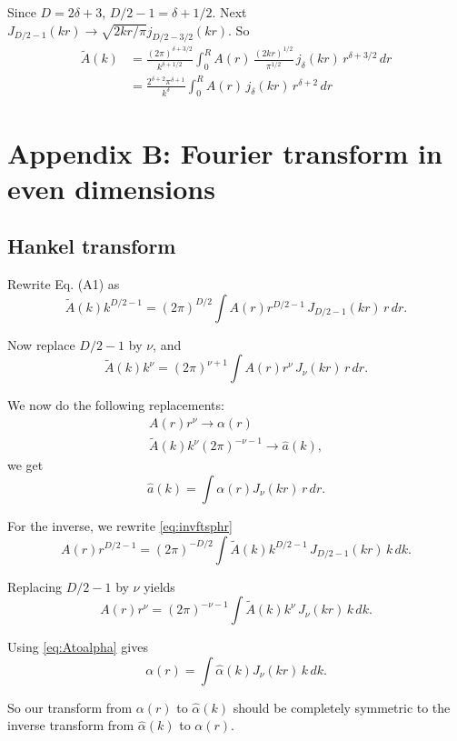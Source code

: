 \documentclass[aip,jcp,reprint,superscriptaddress]{revtex4-1}
\numberwithin{equation}{subsection}
\begin{document}
Since $D = 2\delta + 3$, $D/2 - 1 = \delta + 1/2$.
%
Next $J_{D/2-1}(kr) \rightarrow \sqrt{2 k r/\pi} j_{D/2-3/2} (kr)$.
%
So
\begin{align*}
\tilde A(k)
&=
\frac{ (2 \pi)^{\delta + 3/2} } { k^{\delta + 1/2} }
\int_0^R
  A(r) \, \frac{ (2kr)^{1/2} } { \pi^{1/2} } \,
  j_\delta(k r) \, r^{\delta + 3/2}\, dr \\
&=
  \frac{ 2^{\delta + 2} \pi^{\delta + 1} } { k^\delta }
\int_0^R
  A(r) \, j_\delta(k r) \, r^{\delta + 2} \, dr
\end{align*}



\section{Appendix B: Fourier transform in even dimensions}

\subsection{Hankel transform}

Rewrite Eq. (A1) as
\[
\tilde{A}(k) k^{D/2-1}
= (2 \pi)^{D/2}
\int A(r) r^{D/2-1} \, J_{D/2-1}(kr) \, r \, dr.
\]

Now replace $D/2 - 1$ by $\nu$, and
\[
\tilde{A}(k) k^\nu
= (2 \pi)^{\nu+1}
\int A(r) r^\nu \, J_{\nu}(kr) \, r \, dr.
\]

We now do the following replacements:
\begin{equation}
\begin{split}
  A(r) r^\nu \rightarrow \alpha(r) \\
  \tilde{A}(k) k^\nu (2\pi)^{-\nu-1}
  \rightarrow
  \hat a(k),
\end{split}
\label{eq:Atoalpha}
\end{equation}
we get
\[
\hat a(k)
=
\int \alpha(r) J_\nu(kr) \, r \, dr.
\]

For the inverse, we rewrite \eqref{eq:invftsphr}
\[
A(r) r^{D/2-1}
=
(2\pi)^{-D/2}
\int \tilde{A}(k) k^{D/2-1} \, J_{D/2-1}(kr) \, k \, dk.
\]

Replacing $D/2 - 1$ by $\nu$ yields
\[
A(r) r^\nu
=
(2\pi)^{-\nu-1}
\int \tilde{A}(k) k^\nu \, J_\nu(kr) \, k \, dk.
\]

Using \eqref{eq:Atoalpha} gives
\[
\alpha(r)
=
\int \hat \alpha(k) J_\nu(kr) \, k \, dk.
\]

So our transform from $\alpha(r)$ to $\hat\alpha(k)$
should be completely symmetric to the inverse transform
from $\hat\alpha(k)$ to $\alpha(r)$.
\end{document}
